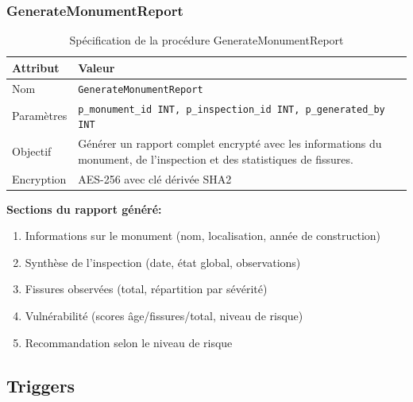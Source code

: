 \documentclass[12pt,a4paper]{article}
\begin{document}
\subsubsection{GenerateMonumentReport}

\begin{table}[H]
\centering
\caption{Spécification de la procédure GenerateMonumentReport}
\begin{tabular}{|p{3cm}|p{10cm}|}
\hline
\textbf{Attribut} & \textbf{Valeur} \\
\hline
Nom & \texttt{GenerateMonumentReport} \\
\hline
Paramètres & \texttt{p\_monument\_id INT, p\_inspection\_id INT, p\_generated\_by INT} \\
\hline
Objectif & Générer un rapport complet encrypté avec les informations du monument, de l'inspection et des statistiques de fissures. \\
\hline
Encryption & AES-256 avec clé dérivée SHA2 \\
\hline
\end{tabular}
\end{table}

\textbf{Sections du rapport généré:}
\begin{enumerate}
    \item Informations sur le monument (nom, localisation, année de construction)
    \item Synthèse de l'inspection (date, état global, observations)
    \item Fissures observées (total, répartition par sévérité)
    \item Vulnérabilité (scores âge/fissures/total, niveau de risque)
    \item Recommandation selon le niveau de risque
\end{enumerate}

\subsection{Triggers}
\end{document}
